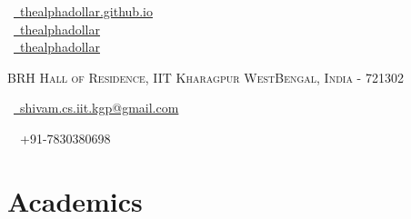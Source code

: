 \documentclass[a4paper,10pt]{extarticle} %
\begin{document}
\pagestyle{empty} %


\begin{multicols}{3}
\normalsize  \faGlobe\ {\href{https://thealphadollar.github.io/}{\  thealphadollar.github.io}}\\
\normalsize \faGithub\ {\href{https://github.com/thealphadollar}{\  thealphadollar}}\\
\normalsize  \faLinkedinSquare\ {\href{https://www.linkedin.com/in/thealphadollar}{\  thealphadollar}}\\
\columnbreak
\normalsize\par{\centering{\huge\textsc{\textcolor{primary}{Shivam Kumar Jha}}}\par} %
\par{\centering\normalsize {\textsc{BRH Hall of Residence, IIT Kharagpur WestBengal, India - 721302}}\hfill\par}
\columnbreak
\raggedright\hfill\normalsize \faEnvelope\ {\href{mailto:shivam.cs.iit.kgp@gmail.com}{\  shivam.cs.iit.kgp@gmail.com}}\\
\raggedright\hfill{\faPhone\ \  +91-7830380698}
\end{multicols}


\vspace{-0.6cm}
\section{\textcolor{primary}{Academics}}
\end{document}
